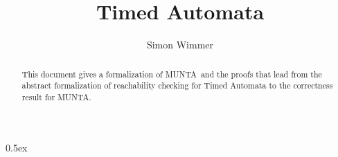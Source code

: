 \documentclass[11pt,a4paper]{article}
\newcommand{\munta}{MUNTA}
\begin{document}
\title{Timed Automata}
\author{Simon Wimmer}

\maketitle
\begin{abstract}
  This document gives a formalization of \munta\ and the proofs that lead from the abstract
  formalization of reachability checking for Timed Automata to the correctness result
  for \munta.
\end{abstract}

\setcounter{tocdepth}{2}
\tableofcontents
\newpage

\parindent 0pt\parskip 0.5ex



%
%
\end{document}
